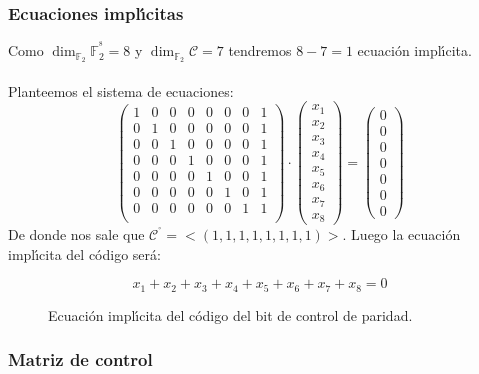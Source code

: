 \subsubsection{Ecuaciones impl\'{\i}citas}

Como $\dim_{\mathbb{F}_2} \mathbb{F}^{^8}_2 = 8$ y
$\dim_{\mathbb{F}_2} \mathcal{C} = 7$ tendremos $8-7=1$ ecuaci\'on
impl\'{\i}cita.\\ \\
%
Planteemos el sistema de ecuaciones:
\begin{displaymath}
\left( \begin{array}{cccccccc}
1&0&0&0&0&0&0&1 \\
0&1&0&0&0&0&0&1 \\
0&0&1&0&0&0&0&1 \\
0&0&0&1&0&0&0&1 \\
0&0&0&0&1&0&0&1 \\
0&0&0&0&0&1&0&1 \\
0&0&0&0&0&0&1&1 \\
\end{array} \right) \cdot
\left( \begin{array}{c}
x_1 \\
x_2 \\
x_3 \\
x_4 \\
x_5 \\
x_6 \\
x_7 \\
x_8
\end{array} \right) =
\left( \begin{array}{c}
0 \\
0 \\
0 \\
0 \\
0 \\
0 \\
0 
\end{array} \right)
\end{displaymath}
De donde nos sale que
$\mathcal{C}^{^\circ} = <(1,1,1,1,1,1,1,1)>$.
Luego la ecuaci\'on impl\'{\i}cita del c\'odigo ser\'a:
\begin{figure}[!h]
$$x_1+x_2+x_3+x_4+x_5+x_6+x_7+x_8 = 0$$
\caption{Ecuaci\'on impl\'{\i}cita del c\'odigo del bit de control de 
paridad.}
\end{figure}

\subsubsection{Matriz de control}

